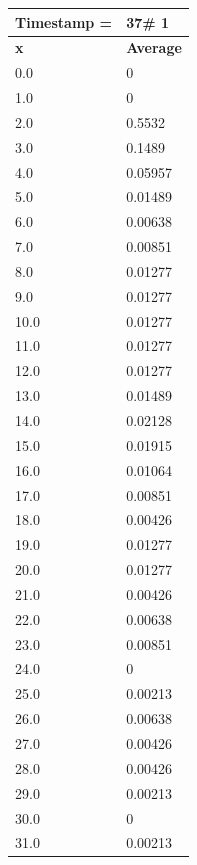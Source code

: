 \begin{tabular}{|l||l|}
\hline
\textbf{Timestamp =} & \textbf{37}\# 1\\\hline
	\textbf{x} & \textbf{Average} \\ \hline
\hline
	0.0 & 0 \\ \hline
	1.0 & 0 \\ \hline
	2.0 & 0.5532 \\ \hline
	3.0 & 0.1489 \\ \hline
	4.0 & 0.05957 \\ \hline
	5.0 & 0.01489 \\ \hline
	6.0 & 0.00638 \\ \hline
	7.0 & 0.00851 \\ \hline
	8.0 & 0.01277 \\ \hline
	9.0 & 0.01277 \\ \hline
	10.0 & 0.01277 \\ \hline
	11.0 & 0.01277 \\ \hline
	12.0 & 0.01277 \\ \hline
	13.0 & 0.01489 \\ \hline
	14.0 & 0.02128 \\ \hline
	15.0 & 0.01915 \\ \hline
	16.0 & 0.01064 \\ \hline
	17.0 & 0.00851 \\ \hline
	18.0 & 0.00426 \\ \hline
	19.0 & 0.01277 \\ \hline
	20.0 & 0.01277 \\ \hline
	21.0 & 0.00426 \\ \hline
	22.0 & 0.00638 \\ \hline
	23.0 & 0.00851 \\ \hline
	24.0 & 0 \\ \hline
	25.0 & 0.00213 \\ \hline
	26.0 & 0.00638 \\ \hline
	27.0 & 0.00426 \\ \hline
	28.0 & 0.00426 \\ \hline
	29.0 & 0.00213 \\ \hline
	30.0 & 0 \\ \hline
	31.0 & 0.00213 \\ \hline
\end{tabular}

